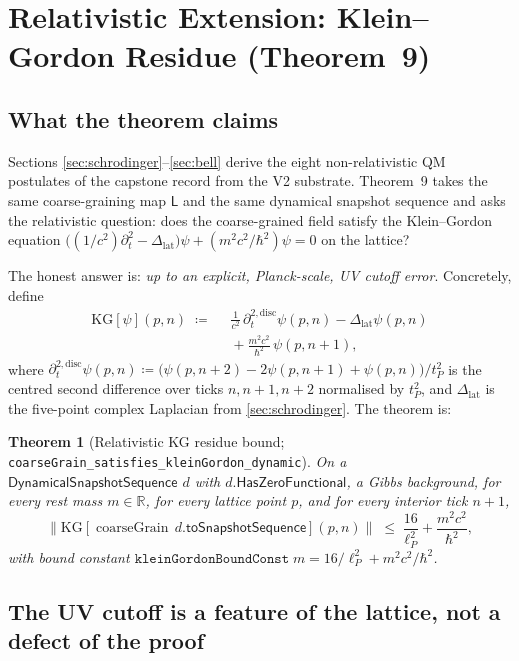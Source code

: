 \documentclass[11pt,a4paper,twoside]{article}
\newtheorem{theorem}{Theorem}[section]
\theoremstyle{definition}
\newcommand{\Rbb}{\mathbb{R}}
\newcommand{\lP}{\ell_P}
\newcommand{\tP}{t_P}
\newcommand{\Lmap}{\mathsf{L}}
\newcommand{\coarseGrain}{\operatorname{coarseGrain}}
\newcommand{\HasZF}{\mathsf{HasZeroFunctional}}
\newcommand{\DynSeq}{\mathsf{DynamicalSnapshotSequence}}
\newcommand{\code}[1]{\texttt{#1}}
\begin{document}
\section{Relativistic Extension: Klein--Gordon Residue
  (Theorem~9)}\label{sec:kleingordon}

\subsection{What the theorem claims}

Sections \ref{sec:schrodinger}--\ref{sec:bell} derive the eight
non-relativistic QM postulates of the capstone record from the V2
substrate. Theorem~9 takes the same coarse-graining map $\Lmap$ and
the same dynamical snapshot sequence and asks the relativistic
question: does the coarse-grained field satisfy the Klein--Gordon
equation $\bigl((1/c^{2})\partial_{t}^{2} -
\Delta_{\mathrm{lat}}\bigr)\psi + (m^{2}c^{2}/\hbar^{2})\psi = 0$ on
the lattice?

The honest answer is: \emph{up to an explicit, Planck-scale, UV cutoff
error}. Concretely, define
\begin{align*}
\mathrm{KG}[\psi](p, n) \;\coloneqq\;&\;
  \tfrac{1}{c^{2}}\,\partial_{t}^{2,\mathrm{disc}}\psi(p, n)
  - \Delta_{\mathrm{lat}}\psi(p, n) \\
&\;+ \tfrac{m^{2} c^{2}}{\hbar^{2}}\,\psi(p, n+1),
\end{align*}
where $\partial_{t}^{2,\mathrm{disc}}\psi(p, n) \coloneqq
\bigl(\psi(p, n+2) - 2\psi(p, n+1) + \psi(p, n)\bigr)/\tP^{2}$ is the
centred second difference over ticks $n, n+1, n+2$ normalised by
$\tP^{2}$, and $\Delta_{\mathrm{lat}}$ is the five-point complex
Laplacian from \cref{sec:schrodinger}. The theorem is:

\begin{theorem}[Relativistic KG residue bound;
  \code{coarseGrain\_satisfies\_kleinGordon\_dynamic}]
\label{thm:T9-informal}
On a $\DynSeq$ $d$ with $d.\HasZF$, a Gibbs background, for every rest
mass $m \in \Rbb$, for every lattice point $p$, and for every interior
tick $n+1$,
\[
\bigl\|\mathrm{KG}[\coarseGrain\,d.\mathsf{toSnapshotSequence}](p, n)\bigr\|
 \;\le\; \frac{16}{\lP^{2}} + \frac{m^{2} c^{2}}{\hbar^{2}},
\]
with bound constant
$\code{kleinGordonBoundConst}\;m = 16/\lP^{2} + m^{2} c^{2}/\hbar^{2}$.
\end{theorem}

\subsection{The UV cutoff is a feature of the lattice, not a defect of
  the proof}
\end{document}
